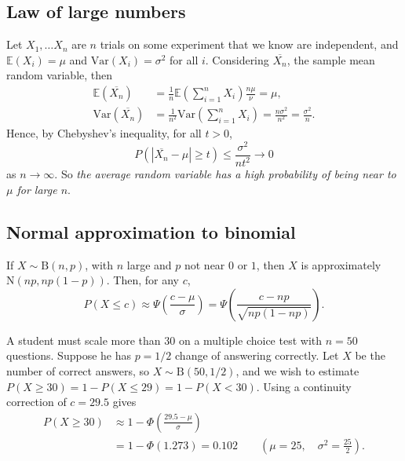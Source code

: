 \documentclass[letter-paper]{tufte-book}
\newenvironment{example}[1][Example]{\begin{trivlist}
\item[\hskip \labelsep {\bfseries #1}]}{\end{trivlist}}
\begin{document}

\subsection{Law of large numbers}

Let $X_1,\ldots X_n$ are $n$ trials on some experiment that we know are
independent, and $\mathbb{E}(X_i) = \mu$ and $\mbox{Var}(X_i) = \sigma^2$ for
all $i$. Considering $\overline{X_n}$, the sample mean random variable, then
\begin{align*}
  \mathbb{E}(\overline{X_n}) 
    & = \frac{1}{n}\mathbb{E}\left(\sum_{i=1}^n X_i\right) \frac{n\mu}{\nu} 
    = \mu,\\
  \mbox{Var}(\overline{X_n}) 
    & = \frac{1}{n^2}\mbox{Var}\left(\sum_{i=1}^n X_i\right)
    = \frac{n\sigma^2}{n^2} = \frac{\sigma^2}{n}.
\end{align*}
Hence, by Chebyshev's inequality, for all $t > 0$, 
\begin{equation*}
  P(|\overline{X_n} - \mu|\geq t) \leq \frac{\sigma^2}{nt^2} \to 0
\end{equation*}
as $n\to\infty$. So \emph{the average random variable has a high probability of
being near to $\mu$ for large $n$}.


\subsection{Normal approximation to binomial}

If $X\sim\mbox{B}(n,p)$, with $n$ large and $p$ not near $0$ or $1$, then $X$ is
approximately $\mbox{N}(np, np(1-p))$. Then, for any $c$,
\begin{equation*}
  P(X\leq c)\approx \Psi\left(\frac{c-\mu}{\sigma}\right) =
  \Psi\left(\frac{c-np}{\sqrt{np(1-np)}}\right).
\end{equation*}
\begin{example}
  A student must scale more than $30$ on a multiple choice test with $n=50$
  questions. Suppose he has $p=1/2$ change of answering correctly. Let $X$ be
  the number of correct answers, so $X\sim\mbox{B}(50,1/2)$, and we wish to
  estimate $P(X\geq30) = 1 - P(X\leq 29) = 1 - P(X < 30)$. Using a continuity
  correction of $c=29.5$ gives
  \begin{align*}
    P(X \geq 30) & \approx 1 - \Phi\left(\frac{29.5 - \mu}{\sigma}\right) \\
      &= 1 - \Phi(1.273) = 0.102 \qquad \left(\mu=25,\quad \sigma^2 = \frac{25}{2}\right).
  \end{align*}
\end{example}
\end{document}
